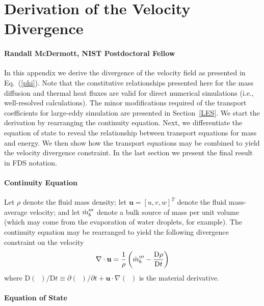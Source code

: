 \documentclass[11pt]{book}
\begin{document}
\chapter{Derivation of the Velocity Divergence}
\label{app_divergence}

\subsubsection{Randall McDermott, NIST Postdoctoral Fellow}

In this appendix we derive the divergence of the velocity field as presented in Eq.~(\ref{phi}).
Note that the constitutive relationships presented here for the mass diffusion and thermal heat fluxes are valid for direct numerical simulations (i.e., well-resolved calculations).
The minor modifications required of the transport coefficients for large-eddy simulation are presented in Section~\ref{LES}.  We start the derivation by rearranging the continuity equation.
Next, we differentiate the equation of state to reveal the relationship between transport equations for mass and energy.
We then show how the transport equations may be combined to yield the velocity divergence constraint.  In the last section we present the final result in FDS notation.

\subsubsection{Continuity Equation}
\label{continuity}

Let $\rho$ denote the fluid mass density; let $\mathbf{u} = [u,v,w]^T$ denote the fluid mass-average velocity; and let $\dot{m}_b^{{\prime\prime\prime}}$
denote a bulk source of mass per unit volume (which may come from the evaporation of water droplets, for example).
The continuity equation may be rearranged to yield the following divergence constraint on the velocity
\begin{equation}
\label{eqn_divconstraint1}
\nabla\cdot \mathbf{u} = \frac{1}{\rho} \left( \dot{m}_b^{{\prime\prime\prime}} -  \frac{\mbox{D} \rho}{\mbox{D} t} \right)
\end{equation}
where $\mbox{D}(\,\,\,)/\mbox{D} t \equiv \partial (\,\,\,)/\partial t + \mathbf{u}\cdot\nabla(\,\,\,)$ is the material derivative.

\subsubsection{Equation of State}
\label{EOS}
\end{document}
